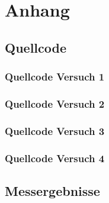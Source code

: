 \documentclass[12pt,oneside,a4paper]{report}
\begin{document}
\chapter*{Anhang}
\label{chap:APPENDIX}
\addtocounter{chapter}{1}
\setcounter{section}{0}

\section{Quellcode}
\label{chap:APPENDIX_SOURCECODE}

\subsection{Quellcode Versuch 1}
\label{chap:APPENDIX_SOURCECODE_V1}

\subsection{Quellcode Versuch 2}
\label{chap:APPENDIX_SOURCECODE_V2}

\subsection{Quellcode Versuch 3}
\label{chap:APPENDIX_SOURCECODE_V3}

\subsection{Quellcode Versuch 4}
\label{chap:APPENDIX_SOURCECODE_V4}


\section{Messergebnisse}
\label{chap:APPENDIX_MEASUREMENT_SOURCE}

%
%

\end{document}
